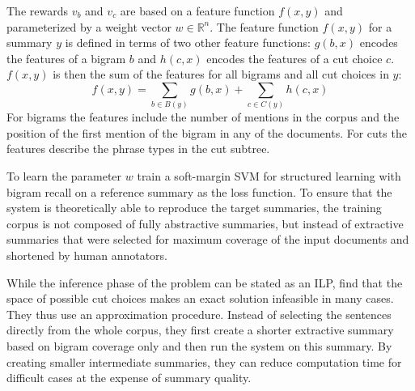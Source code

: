 \documentclass[a4paper,BCOR=10mm]{report}
\numberwithin{lemma}{chapter}
\numberwithin{definition}{chapter}
\begin{document}
The rewards $v_b$ and $v_c$ are based on a feature function $f(x, y)$ and parameterized by a weight vector $w \in \mathbb{R}^n$.
The feature function $f(x, y)$ for a summary $y$ is defined in terms of two other feature functions: $g(b, x)$ encodes the features of a bigram $b$ and $h(c, x)$ encodes the features of a cut choice $c$. $f(x, y)$ is then the sum of the features for all bigrams and all cut choices in $y$:
\begin{equation}
f(x, y) = \sum_{b \in B(y)} g(b, x) + \sum_{c \in C(y)} h(c, x)
\end{equation}
For bigrams the features include the number of mentions in the corpus and the position of the first mention of the bigram in any of the documents.
For cuts the features describe the phrase types in the cut subtree.

To learn the parameter $w$ \citeauthor{berg-kirkpatrick} train a soft-margin SVM for structured learning \citet{svm} with bigram recall on a reference summary as the loss function. To ensure that the system is theoretically able to reproduce the target summaries, the training corpus is not composed of fully abstractive summaries, but instead of extractive summaries that were selected for maximum coverage of the input documents and shortened by human annotators.

While the inference phase of the problem can be stated as an ILP, \citet{berg-kirkpatrick} find that the space of possible cut choices makes an exact solution infeasible in many cases. They thus use an approximation procedure. Instead of selecting the sentences directly from the whole corpus, they first create a shorter extractive summary based on bigram coverage only and then run the system on this summary. By creating smaller intermediate summaries, they can reduce computation time for difficult cases at the expense of summary quality.




\end{document}
